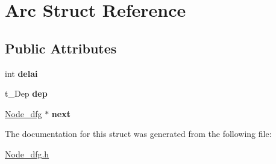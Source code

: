 \hypertarget{struct_arc}{
\section{\-Arc \-Struct \-Reference}
\label{struct_arc}
}
\subsection*{\-Public \-Attributes}
\begin{DoxyCompactItemize}
\item 
\hypertarget{struct_arc_a5ded385f25722f3ffe41cdc8adbeedf1}{
int {\bfseries delai}}
\label{struct_arc_a5ded385f25722f3ffe41cdc8adbeedf1}

\item 
\hypertarget{struct_arc_a737b68a146ab73723e531bcd99feb9d7}{
t\-\_\-\-Dep {\bfseries dep}}
\label{struct_arc_a737b68a146ab73723e531bcd99feb9d7}

\item 
\hypertarget{struct_arc_a3dbfe4878415cb35c308e80823b837d3}{
\hyperlink{class_node__dfg}{\-Node\-\_\-dfg} $\ast$ {\bfseries next}}
\label{struct_arc_a3dbfe4878415cb35c308e80823b837d3}

\end{DoxyCompactItemize}


\-The documentation for this struct was generated from the following file\-:\begin{DoxyCompactItemize}
\item 
\hyperlink{_node__dfg_8h}{\-Node\-\_\-dfg.\-h}\end{DoxyCompactItemize}
